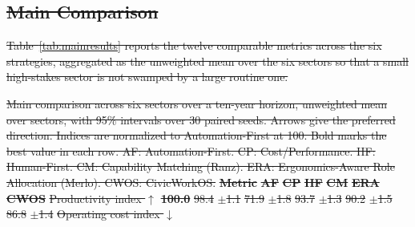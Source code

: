 \documentclass[utf8]{FrontiersinHarvard}
\providecommand{\DIFdel}[1]{{\protect\color{red}\sout{#1}}}                      %
\providecommand{\DIFdelFL}[1]{\DIFdel{#1}} %
\begin{document}
\subsection{\DIFdel{Main Comparison}}
\addtocounter{subsection}{-1}%

\DIFdel{Table~\ref{tab:mainresults} reports the twelve comparable metrics across the six strategies, aggregated as the unweighted mean over the six sectors so that a small high-stakes sector is not swamped by a large routine one.
	}%

{%
\DIFdelFL{Main comparison across six sectors over a ten-year horizon, unweighted mean over sectors, with 95\% intervals over 30 paired seeds. Arrows give the preferred direction. Indices are normalized to Automation-First at 100. Bold marks the best value in each row. AF: Automation-First. CP: Cost/Performance. HF: Human-First. CM: Capability Matching (Ranz). ERA: Ergonomics-Aware Role Allocation (Merlo). CWOS: CivicWorkOS.}}
\textbf{\DIFdelFL{Metric}} %
\textbf{\DIFdelFL{AF}} %
\textbf{\DIFdelFL{CP}} %
\textbf{\DIFdelFL{HF}} %
\textbf{\DIFdelFL{CM}} %
\textbf{\DIFdelFL{ERA}} %
\textbf{\DIFdelFL{CWOS}}%
\DIFdelFL{Productivity index $\uparrow$ }%
\textbf{\DIFdelFL{100.0}} %
\DIFdelFL{98.4 }%
\DIFdelFL{$\pm$1.1}%
\DIFdelFL{71.9 }%
\DIFdelFL{$\pm$1.8}%
\DIFdelFL{93.7 }%
\DIFdelFL{$\pm$1.3}%
\DIFdelFL{90.2 }%
\DIFdelFL{$\pm$1.5}%
\DIFdelFL{86.8 }%
\DIFdelFL{$\pm$1.4}%
\DIFdelFL{Operating cost index $\downarrow$ }%
\end{document}
